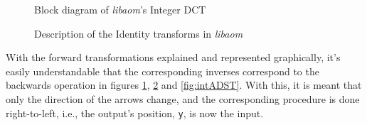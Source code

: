 \begin{figure}[!htbp]
    \centering
    
    \caption{Block diagram of \emph{libaom}'s Integer DCT}
    \label{fig:intDCT}
\end{figure}


\begin{figure}[!htbp]
    \centering
    
    \caption{Description of the Identity transforms in \emph{libaom}}
    \label{fig:intIDEN}
\end{figure}

With the forward transformations explained and represented graphically, it's easily understandable that the corresponding inverses correspond to the backwards operation in figures \ref{fig:intDCT}, \ref{fig:intIDEN} and \ref{fig:intADST}. With this, it is meant that only the direction of the arrows change, and the corresponding procedure is done right-to-left, i.e., the output's position, \texttt{y}, is now the input.


\clearpage
\printbibliography[heading=subbibliography]
